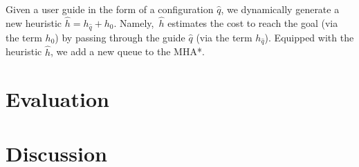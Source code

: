 \documentclass[conference]{IEEEtran}
\begin{document}
Given a user guide in the form of a configuration $\hat{q}$, we dynamically generate a new heuristic $\hat{h} = h_{\hat{q}} + h_0$.
Namely,~$\hat{h}$ estimates the 
cost to reach the goal (via the term $h_0$) by passing through the guide $\hat{q}$ (via the term $h_{\hat{q}}$).
Equipped with the heuristic $\hat{h}$, we add a new queue to the MHA*. 
\section{Evaluation}\label{sec:evaluation}

\section{Discussion}\label{sec:discussion}


%


\end{document}

